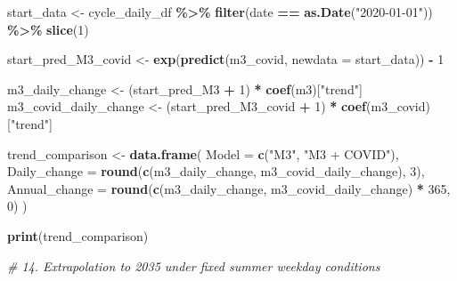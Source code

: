 \documentclass[
]{article}
\newenvironment{Shaded}{\begin{snugshade}}{\end{snugshade}}
\newcommand{\AttributeTok}[1]{\textcolor[rgb]{0.13,0.29,0.53}{#1}}
\newcommand{\CommentTok}[1]{\textcolor[rgb]{0.56,0.35,0.01}{\textit{#1}}}
\newcommand{\DecValTok}[1]{\textcolor[rgb]{0.00,0.00,0.81}{#1}}
\newcommand{\FunctionTok}[1]{\textcolor[rgb]{0.13,0.29,0.53}{\textbf{#1}}}
\newcommand{\NormalTok}[1]{#1}
\newcommand{\OtherTok}[1]{\textcolor[rgb]{0.56,0.35,0.01}{#1}}
\newcommand{\SpecialCharTok}[1]{\textcolor[rgb]{0.81,0.36,0.00}{\textbf{#1}}}
\newcommand{\StringTok}[1]{\textcolor[rgb]{0.31,0.60,0.02}{#1}}
\begin{document}
\begin{Shaded}
\begin{Highlighting}[]
\NormalTok{start\_data }\OtherTok{\textless{}{-}}\NormalTok{ cycle\_daily\_df }\SpecialCharTok{\%\textgreater{}\%} \FunctionTok{filter}\NormalTok{(date }\SpecialCharTok{==} \FunctionTok{as.Date}\NormalTok{(}\StringTok{"2020{-}01{-}01"}\NormalTok{)) }\SpecialCharTok{\%\textgreater{}\%} \FunctionTok{slice}\NormalTok{(}\DecValTok{1}\NormalTok{)}

\NormalTok{start\_pred\_M3\_covid }\OtherTok{\textless{}{-}} \FunctionTok{exp}\NormalTok{(}\FunctionTok{predict}\NormalTok{(m3\_covid, }\AttributeTok{newdata =}\NormalTok{ start\_data)) }\SpecialCharTok{{-}} \DecValTok{1}

\NormalTok{m3\_daily\_change }\OtherTok{\textless{}{-}}\NormalTok{ (start\_pred\_M3 }\SpecialCharTok{+} \DecValTok{1}\NormalTok{) }\SpecialCharTok{*} \FunctionTok{coef}\NormalTok{(m3)[}\StringTok{"trend"}\NormalTok{]}
\NormalTok{m3\_covid\_daily\_change }\OtherTok{\textless{}{-}}\NormalTok{ (start\_pred\_M3\_covid }\SpecialCharTok{+} \DecValTok{1}\NormalTok{) }\SpecialCharTok{*} \FunctionTok{coef}\NormalTok{(m3\_covid)[}\StringTok{"trend"}\NormalTok{]}

\NormalTok{trend\_comparison }\OtherTok{\textless{}{-}} \FunctionTok{data.frame}\NormalTok{(}
  \AttributeTok{Model =} \FunctionTok{c}\NormalTok{(}\StringTok{"M3"}\NormalTok{, }\StringTok{"M3 + COVID"}\NormalTok{),}
  \AttributeTok{Daily\_change =} \FunctionTok{round}\NormalTok{(}\FunctionTok{c}\NormalTok{(m3\_daily\_change, m3\_covid\_daily\_change), }\DecValTok{3}\NormalTok{),}
  \AttributeTok{Annual\_change =} \FunctionTok{round}\NormalTok{(}\FunctionTok{c}\NormalTok{(m3\_daily\_change, m3\_covid\_daily\_change) }\SpecialCharTok{*} \DecValTok{365}\NormalTok{, }\DecValTok{0}\NormalTok{)}
\NormalTok{)}

\FunctionTok{print}\NormalTok{(trend\_comparison)}

\CommentTok{\# 14. Extrapolation to 2035 under fixed summer weekday conditions}


\end{Highlighting}
\end{Shaded}
\end{document}
